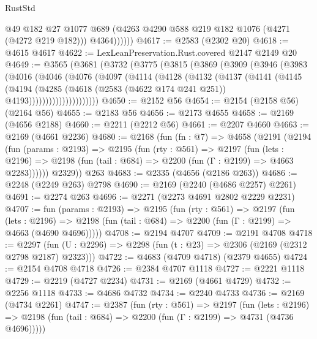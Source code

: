 \begin{lexlean}{RustStd}
\begin{coremodule}
                @49
                @182
                @27
                @1077
                @689
                (@4263 @4290 @588 @219 @182 @1076 (@4271 (@4272 @219 @182)))
                @4364))))))
@4617 := @2583 (@2302 @20)
@4618 := @4615 @4617
@4622 := LexLeanPreservation.Rust.covered @2147 @2149 @20
@4649 := @3565
    (@3681
      (@3732
        (@3775
          (@3815
            (@3869
              (@3909
                (@3946
                  (@3983
                    (@4016
                      (@4046
                        (@4076
                          (@4097
                            (@4114
                              (@4128
                                (@4132
                                  (@4137
                                    (@4141
                                      (@4145
                                        (@4194
                                          (@4285
                                            (@4618
                                              (@2583 (@4622 @174 @241 @251))
                                              @4193)))))))))))))))))))))
@4650 := @2152 @56
@4654 := @2154 (@2158 @56) (@2164 @56)
@4655 := @2183 @56
@4656 := @2173 @4655
@4658 := @2169 (@4656 @2188)
@4660 := @2211 (@2212 @56)
@4661 := @2207 @4660
@4663 := @2169 (@4661 @2236)
@4680 := @2168
    (fun (fn : @7) =>
    @4658
      (@2191
        (@2194
          (fun (params : @2193) =>
          @2195
            (fun (rty : @561) =>
            @2197
              (fun (lets : @2196) =>
              @2198 (fun (tail : @684) => @2200 (fun (Γ : @2199) => @4663 @2283))))))
        @2329))
    @263
@4683 := @2335 (@4656 (@2186 @263))
@4686 := @2248 (@2249 @263) @2798
@4690 := @2169 (@2240 (@4686 @2257) @2261)
@4691 := @2274 @263
@4696 := @2271 (@2273 @4691 @2802 @2229 @2231)
@4707 := fun (params : @2193) =>
  @2195
    (fun (rty : @561) =>
    @2197
      (fun (lets : @2196) =>
      @2198 (fun (tail : @684) => @2200 (fun (Γ : @2199) => @4663 (@4690 @4696)))))
@4708 := @2194 @4707
@4709 := @2191 @4708
@4718 := @2297 (fun (U : @2296) => @2298 (fun (t : @23) => @2306 (@2169 (@2312 @2798 @2187) @2323)))
@4722 := @4683 (@4709 @4718) (@2379 @4655)
@4724 := @2154 @4708 @4718
@4726 := @2384 @4707 @1118
@4727 := @2221 @1118
@4729 := @2219 (@4727 @2234)
@4731 := @2169 (@4661 @4729)
@4732 := @2256 @1118
@4733 := @4686 @4732
@4734 := @2240 @4733
@4736 := @2169 (@4734 @2261)
@4747 := @2387
    (fun (rty : @561) =>
    @2197
      (fun (lets : @2196) =>
      @2198 (fun (tail : @684) => @2200 (fun (Γ : @2199) => @4731 (@4736 @4696)))))

\end{coremodule}
\end{lexlean}
